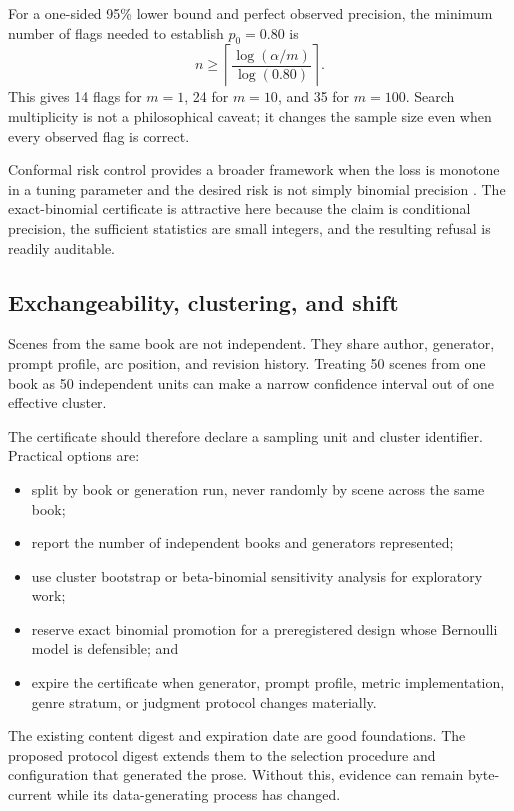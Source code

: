 \documentclass[11pt]{article}
\begin{document}
For a one-sided 95\% lower bound and perfect observed precision, the minimum number of flags
needed to establish $p_0=0.80$ is
\[
 n\ge\left\lceil\frac{\log(\alpha/m)}{\log(0.80)}\right\rceil.
\]
This gives 14 flags for $m=1$, 24 for $m=10$, and 35 for $m=100$. Search multiplicity is not
a philosophical caveat; it changes the sample size even when every observed flag is correct.

Conformal risk control provides a broader framework when the loss is monotone in a tuning
parameter and the desired risk is not simply binomial precision \cite{angelopoulos2024crc}.
The exact-binomial certificate is attractive here because the claim is conditional precision,
the sufficient statistics are small integers, and the resulting refusal is readily auditable.

\subsection{Exchangeability, clustering, and shift}

Scenes from the same book are not independent. They share author, generator, prompt profile,
arc position, and revision history. Treating 50 scenes from one book as 50 independent units
can make a narrow confidence interval out of one effective cluster.

The certificate should therefore declare a sampling unit and cluster identifier. Practical
options are:

\begin{itemize}
  \item split by book or generation run, never randomly by scene across the same book;
  \item report the number of independent books and generators represented;
  \item use cluster bootstrap or beta-binomial sensitivity analysis for exploratory work;
  \item reserve exact binomial promotion for a preregistered design whose Bernoulli model is
  defensible; and
  \item expire the certificate when generator, prompt profile, metric implementation, genre
  stratum, or judgment protocol changes materially.
\end{itemize}

The existing content digest and expiration date are good foundations. The proposed protocol
digest extends them to the selection procedure and configuration that generated the prose.
Without this, evidence can remain byte-current while its data-generating process has changed.
\end{document}
